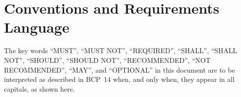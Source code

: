 \documentclass[11pt,letterpaper]{article}
\begin{document}
\setcounter{tocdepth}{2}
\tableofcontents
\newpage

\section*{Conventions and Requirements Language}
The key words ``MUST'', ``MUST NOT'', ``REQUIRED'', ``SHALL'', ``SHALL NOT'', ``SHOULD'', ``SHOULD NOT'', ``RECOMMENDED'', ``NOT RECOMMENDED'', ``MAY'', and ``OPTIONAL'' in this document are to be interpreted as described in BCP~14 \citep{rfc2119,rfc8174} when, and only when, they appear in all capitals, as shown here.















\end{document}
